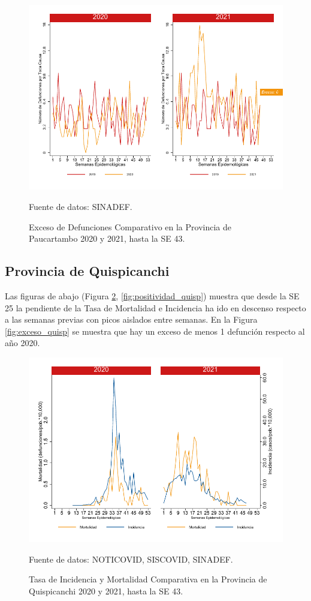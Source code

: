 \documentclass[12pt,a4paper,openany]{book}
\begin{document}
		\begin{figure}[h]
			\caption{Exceso de Defunciones Comparativo en la Provincia de Paucartambo 2020 y 2021, hasta la SE 43.}\label{fig:exceso_paucartam}
			\begin{center}
				\includegraphics[width=0.7\linewidth]{../figuras/exceso_11}
			\end{center}
			{\footnotesize {Fuente de datos: SINADEF.}}
		\end{figure}
		
		\clearpage
		
		\subsection*{Provincia de Quispicanchi}
		\noindent Las figuras de abajo (Figura \ref{fig:inc_mort_quisp}, \ref{fig:positividad_quisp}) muestra que desde la SE 25 la pendiente de la Tasa de Mortalidad e Incidencia ha ido en descenso respecto a las semanas previas con picos aislados entre semanas. En la Figura \ref{fig:exceso_quisp} se muestra que hay un exceso de menos 1 defunción respecto al año 2020.
		
		\begin{figure}[h]
			\caption{Tasa de Incidencia y Mortalidad Comparativa en la Provincia de Quispicanchi 2020 y 2021, hasta la SE 43.}\label{fig:inc_mort_quisp}
			\begin{center}
				\includegraphics[width=0.7\linewidth]{../figuras/incidencia_mortalidad_20_21_12}
			\end{center}
			{\footnotesize {Fuente de datos: NOTICOVID, SISCOVID, SINADEF.}}
		\end{figure}
		
\end{document}
